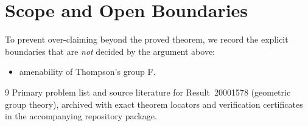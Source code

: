 \documentclass[10pt,reqno]{amsart}
\theoremstyle{definition}
\begin{document}
\section{Scope and Open Boundaries}

To prevent over-claiming beyond the proved theorem, we record the explicit boundaries that are \emph{not} decided by the argument above:
\begin{itemize}
  \item amenability of Thompson's group F.
\end{itemize}

\begin{thebibliography}{9}
Primary problem list and source literature for Result~20001578 (geometric group theory), archived with exact theorem locators and verification certificates in the accompanying repository package.
\end{thebibliography}
\end{document}
